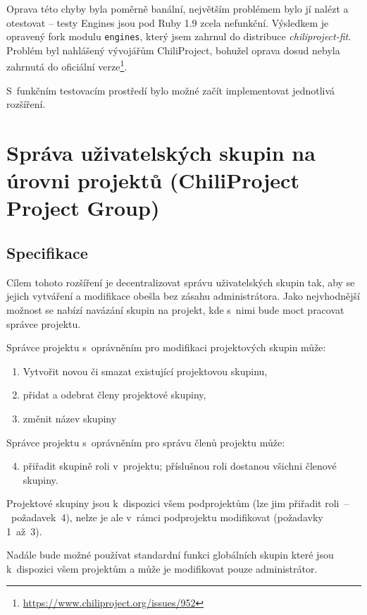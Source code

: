 \documentclass[thesis=B,czech]{FITthesis}[2012/05/02]
\begin{document}
Oprava této chyby byla poměrně banální, největším problémem bylo jí
nalézt a otestovat -- testy Engines jsou pod Ruby 1.9 zcela nefunkční.
Výsledkem je opravený \gls{fork} modulu \lstinline!engines!, který jsem
zahrnul do distribuce \emph{chiliproject-fit}. Problém byl
nahlášený vývojářům ChiliProject, bohužel oprava dosud nebyla zahrnutá
do oficiální verze\footnote{\url{https://www.chiliproject.org/issues/952}}.

S~funkčním testovacím prostředí bylo možné začít implementovat
jednotlivá rozšíření.

\section[Správa uživatelských skupin na úrovni projektů]{Správa uživatelských skupin na úrovni projektů (ChiliProject
Project Group)}
\label{sec:project_group}

\subsection{Specifikace}

Cílem tohoto rozšíření je decentralizovat správu uživatelských skupin
tak, aby se jejich vytváření a modifikace obešla bez zásahu
administrátora. Jako nejvhodnější možnost se nabízí navázání skupin na
projekt, kde s~nimi bude moct pracovat správce projektu.

Správce projektu s~oprávněním pro modifikaci projektových skupin může:

\begin{enumerate}[1.]
\item
  Vytvořit novou či smazat existující projektovou skupinu,
\item
  přidat a odebrat členy projektové skupiny,
\item
  změnit název skupiny
\end{enumerate}
Správce projektu s~oprávněním pro správu členů projektu může:

\begin{enumerate}[1.]
\setcounter{enumi}{3}
\item
  přiřadit skupině roli v~projektu; příslušnou roli dostanou všichni
  členové skupiny.
\end{enumerate}
Projektové skupiny jsou k~dispozici všem podprojektům (lze jim přiřadit
roli~--~požadavek~4), nelze je ale v~rámci podprojektu modifikovat
(požadavky 1~až~3).

Nadále bude možné používat standardní funkci globálních skupin které
jsou k~dispozici všem projektům a může je modifikovat pouze
administrátor.
\end{document}

